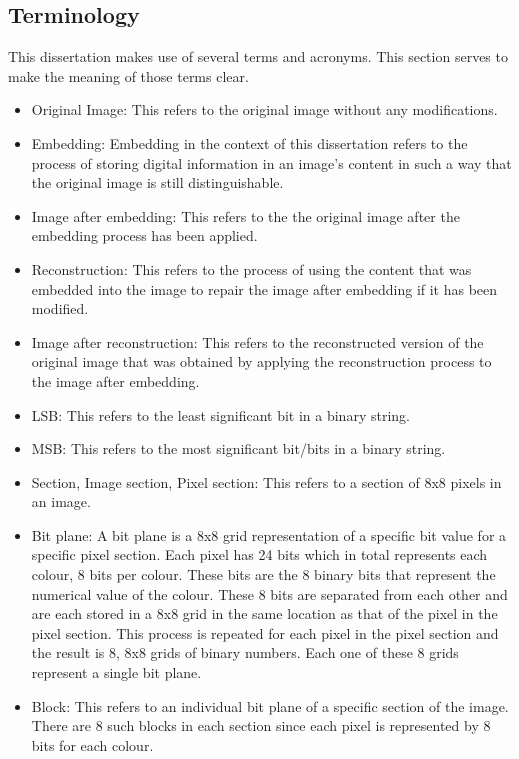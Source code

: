 \documentclass[12pt]{article}
\begin{document}
\subsection{Terminology}
This dissertation makes use of several terms and acronyms.
This section serves to make the meaning of those terms clear.

\begin{itemize}
  \item Original Image: This refers to the original image without any modifications.
  \item Embedding: Embedding in the context of this dissertation refers to the process of storing digital information in an image's content in such a way that the original image is still distinguishable.
  \item Image after embedding: This refers to the the original image after the embedding process has been applied.
  \item Reconstruction: This refers to the process of using the content that was embedded into the image to repair the image after embedding if it has been modified.
  \item Image after reconstruction: This refers to the reconstructed version of the original image that was obtained by applying the reconstruction process to the image after embedding.
  \item LSB: This refers to the least significant bit in a binary string.
  \item MSB: This refers to the most significant bit/bits in a binary string.
  \item Section, Image section, Pixel section: This refers to a section of 8x8 pixels in an image.
  \item Bit plane: A bit plane is a 8x8 grid representation of a specific bit value for a specific pixel section. Each pixel has 24 bits which in total represents each colour, 8 bits per colour. These bits are the 8 binary bits that represent the numerical value of the colour. These 8 bits are separated from each other and are each stored in a 8x8 grid in the same location as that of the pixel in the pixel section. This process is repeated for each pixel in the pixel section and the result is 8, 8x8 grids of binary numbers. Each one of these 8 grids represent a single bit plane. 
  \item Block: This refers to an individual bit plane of a specific section of the image. There are 8 such blocks in each section since each pixel is represented by 8 bits for each colour.
\end{itemize}
\end{document}
